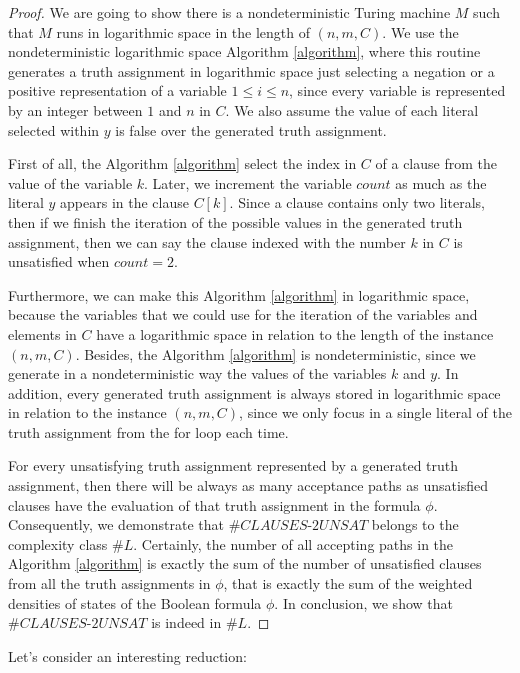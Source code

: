 \documentclass[a4paper,UKenglish,cleveref, autoref]{lipics-v2019}
\begin{document}
\begin{proof}
We are going to show there is a nondeterministic Turing machine $M$ such that $M$ runs in logarithmic space in the length of $(n, m, C)$. We use the nondeterministic logarithmic space Algorithm \ref{algorithm}, where this routine generates a truth assignment in logarithmic space just selecting a negation or a positive representation of a variable $1 \leq i \leq n$, since every variable is represented by an integer between $1$ and $n$ in $C$. We also assume the value of each literal selected within $y$ is false over the generated truth assignment.

First of all, the Algorithm \ref{algorithm} select the index in $C$ of a clause from the value of the variable $k$. Later, we increment the variable $count$ as much as the literal $y$ appears in the clause $C[k]$. Since a clause contains only two literals, then if we finish the iteration of the possible values in the generated truth assignment, then we can say the clause indexed with the number $k$ in $C$ is unsatisfied when $count = 2$.

Furthermore, we can make this Algorithm \ref{algorithm} in logarithmic space, because the variables that we could use for the iteration of the variables and elements in $C$ have a logarithmic space in relation to the length of the instance $(n, m, C)$. Besides, the Algorithm \ref{algorithm} is nondeterministic, since we generate in a nondeterministic way the values of the variables $k$ and $y$. In addition, every generated truth assignment is always stored in logarithmic space in relation to the instance $(n, m, C)$, since we only focus in a single literal of the truth assignment from the for loop each time.

For every unsatisfying truth assignment represented by a generated truth assignment, then there will be always as many acceptance paths as unsatisfied clauses have the evaluation of that truth assignment in the formula $\phi$. Consequently, we demonstrate that $\#\textit{CLAUSES-2UNSAT}$ belongs to the complexity class $\#L$. Certainly, the number of all accepting paths in the Algorithm \ref{algorithm} is exactly the sum of the number of unsatisfied clauses from all the truth assignments in $\phi$, that is exactly the sum of the weighted densities of states of the Boolean formula $\phi$. In conclusion, we show that $\#\textit{CLAUSES-2UNSAT}$ is indeed in $\#L$.
\end{proof}

Let's consider an interesting reduction:
\end{document}
